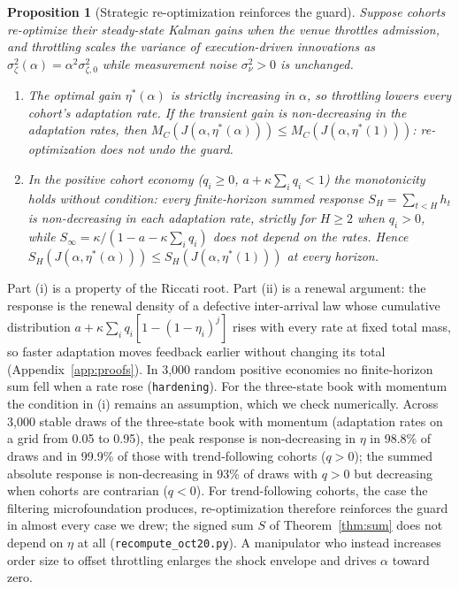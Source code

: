\documentclass[12pt]{article}
\newtheorem{proposition}[theorem]{Proposition}
\theoremstyle{definition}
\theoremstyle{remark}
\begin{document}
\begin{proposition}[Strategic re-optimization reinforces the guard]\label{prop:lucas}
Suppose cohorts re-optimize their steady-state Kalman gains when the venue throttles admission, and throttling scales the variance of execution-driven innovations as $\sigma_\zeta^2(\alpha)=\alpha^2\sigma_{\zeta,0}^2$ while measurement noise $\sigma_\nu^2>0$ is unchanged.
\begin{enumerate}[label=(\roman*)]
\item The optimal gain $\eta^*(\alpha)$ is strictly increasing in $\alpha$, so throttling lowers every cohort's adaptation rate. If the transient gain is non-decreasing in the adaptation rates, then $M_C(J(\alpha,\eta^*(\alpha)))\le M_C(J(\alpha,\eta^*(1)))$: re-optimization does not undo the guard.
\item In the positive cohort economy ($q_i\ge0$, $a+\kappa\sum_iq_i<1$) the monotonicity holds without condition: every finite-horizon summed response $S_H=\sum_{t<H}h_t$ is non-decreasing in each adaptation rate, strictly for $H\ge2$ when $q_i>0$, while $S_\infty=\kappa/(1-a-\kappa\sum_iq_i)$ does not depend on the rates. Hence $S_H(J(\alpha,\eta^*(\alpha)))\le S_H(J(\alpha,\eta^*(1)))$ at every horizon.
\end{enumerate}
\end{proposition}

Part (i) is a property of the Riccati root. Part (ii) is a renewal argument: the response is the renewal density of a defective inter-arrival law whose cumulative distribution $a+\kappa\sum_iq_i[1-(1-\eta_i)^j]$ rises with every rate at fixed total mass, so faster adaptation moves feedback earlier without changing its total (Appendix~\ref{app:proofs}). In 3{,}000 random positive economies no finite-horizon sum fell when a rate rose (\texttt{hardening}). For the three-state book with momentum the condition in (i) remains an assumption, which we check numerically. Across 3{,}000 stable draws of the three-state book with momentum (adaptation rates on a grid from 0.05 to 0.95), the peak response is non-decreasing in $\eta$ in 98.8\% of draws and in 99.9\% of those with trend-following cohorts ($q>0$); the summed absolute response is non-decreasing in 93\% of draws with $q>0$ but decreasing when cohorts are contrarian ($q<0$). For trend-following cohorts, the case the filtering microfoundation produces, re-optimization therefore reinforces the guard in almost every case we drew; the signed sum $S$ of Theorem~\ref{thm:sum} does not depend on $\eta$ at all (\texttt{recompute\_oct20.py}). A manipulator who instead increases order size to offset throttling enlarges the shock envelope and drives $\alpha$ toward zero.
\end{document}
